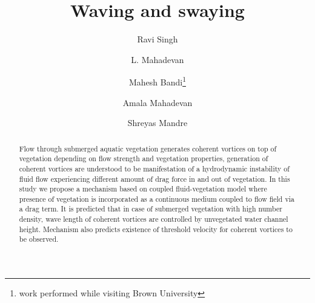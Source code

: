 \documentclass[aps,preprint,floatfix,prl]{revtex4-1}
\begin{document}
\title{Waving and swaying}
\author{Ravi Singh}
\author{L. Mahadevan}
\author{Mahesh Bandi\footnote{work performed while visiting Brown University}}
\author{Amala Mahadevan}
\author{Shreyas Mandre}

\begin{abstract}

Flow through submerged aquatic vegetation generates coherent vortices on top of vegetation depending on flow strength and vegetation 
properties, generation of coherent vortices are understood to be manifestation of a hydrodynamic instability of fluid flow experiencing 
different amount of drag force in and out of vegetation. In this study we propose a mechanism based on coupled fluid-vegetation model where presence of vegetation is incorporated 
as a continuous medium coupled to flow field via a drag term. It is predicted that in case of submerged vegetation with high number density,
wave length of coherent vortices are %
controlled by unvegetated water channel height. Mechanism also predicts existence of threshold velocity for coherent vortices to be observed.     
\end{abstract}
\maketitle
\end{document}

